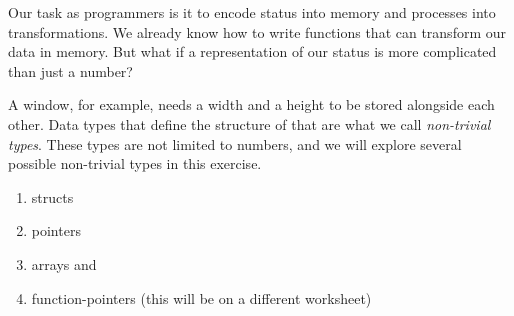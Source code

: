 \documentclass{dcbl/challenge}
\begin{document}
Our task as programmers is it to encode status into memory and processes into transformations.
We already know how to write functions that can transform our data in memory. But what if a representation of our status is more complicated than just a number?

A window, for example, needs a width and a height to be stored alongside each other.
Data types that define the structure of that are what we call \textit{non-trivial types}.
These types are not limited to numbers, and we will explore several possible non-trivial types in this exercise.
\begin{enumerate}
    \item structs
    \item pointers
    \item arrays and
    \item function-pointers (this will be on a different worksheet)
\end{enumerate}
\end{document}
